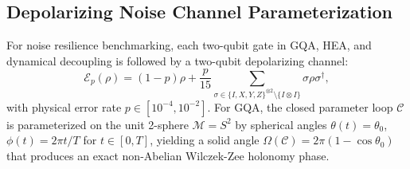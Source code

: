 \documentclass{article}
\begin{document}
\subsection{Depolarizing Noise Channel Parameterization}
\label{sec:noise_details}

For noise resilience benchmarking, each two-qubit gate in GQA, HEA, and dynamical decoupling is followed by a two-qubit depolarizing channel:
\begin{equation}
\mathcal{E}_p(\rho) = (1 - p)\rho + \frac{p}{15} \sum_{\sigma \in \{I, X, Y, Z\}^{\otimes 2} \setminus \{I \otimes I\}} \sigma \rho \sigma^\dagger,
\end{equation}
with physical error rate $p \in [10^{-4}, 10^{-2}]$. For GQA, the closed parameter loop $\mathcal{C}$ is parameterized on the unit 2-sphere $\mathcal{M} = S^2$ by spherical angles $\theta(t) = \theta_0$, $\phi(t) = 2\pi t / T$ for $t \in [0, T]$, yielding a solid angle $\Omega(\mathcal{C}) = 2\pi(1 - \cos\theta_0)$ that produces an exact non-Abelian Wilczek-Zee holonomy phase.
\end{document}
